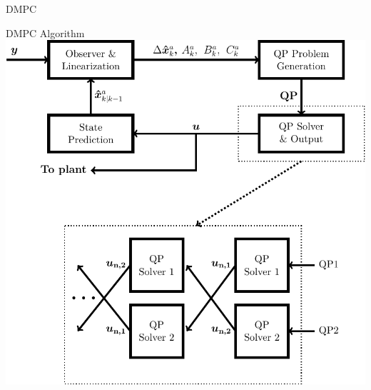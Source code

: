 \begin{frame}{DMPC}
\end{frame}

\begin{frame}{DMPC Algorithm}
    \centering
    \includegraphics[width=.6\linewidth]{figures/algorithm.pdf}
\end{frame}


